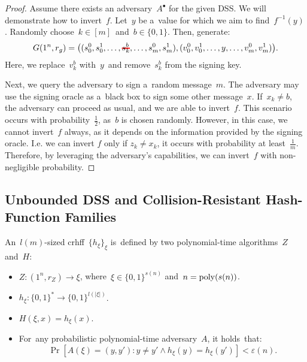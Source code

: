 \begin{proof}
	Assume there exists an adversary~$A^{\bullet}$ for the given DSS.
	We will demonstrate how to invert~$f$.
	Let~$y$ be a~value for which we aim to find~$f^{-1}(y)$.
	Randomly choose~$k \in [m]$~and~$b \in \{0, 1\}$. Then, generate:
	\[
		G(1^{n}, r_g) = \big((s^{0}_{0}, s^{1}_{0}, \ldots, \hcancel[red]{s_{k}}^{b}, \ldots, s^{0}_{m}, s^{1}_{m}), (v^{0}_{0}, v^{1}_{0}, \ldots, y, \ldots, v^{0}_{m}, v^{1}_{m})\big).
	\] 
	Here, we replace~$v_{k}^{b}$ with~$y$~and remove~$s_{k}^{b}$ from the signing key.

	Next, we query the adversary to sign a~random message~$m$.
	The adversary may use the signing oracle as a~black box to sign some other message~$x$.
	If~$x_k \neq b$, the adversary can proceed as usual, and we are able to invert~$f$.
	This scenario occurs with probability~$\frac{1}{2}$, as~$b$ is chosen randomly.
	However, in this case, we cannot invert~$f$ always, as it depends on the information provided by the signing oracle.
	I.e. we can invert $f$ only if  $z_{k} \neq  x_k$, it occurs with probability at least~$\frac{1}{m}$.
	Therefore, by leveraging the adversary's capabilities, we can invert~$f$ with non-negligible probability.
\end{proof}

\subsection{Unbounded DSS and Collision-Resistant Hash-Function Families}

\begin{definition}
    An~$l(m)$-sized crhff~$\{h_{\xi}\}_{\xi}$ is~defined by two polynomial-time algorithms~$Z$ and~$H$:
    \begin{itemize}
        \item $Z \colon (1^{n}, r_Z) \to \xi$, where~$\xi \in \{0, 1\}^{s(n)}$ and~$n = \operatorname{poly}(s(n))$.
        \item $h_{\xi} \colon \{0, 1\}^{*} \to \{0, 1\}^{l(|\xi|)}$.
        \item $H(\xi, x) = h_\xi(x)$.
        \item For~any probabilistic polynomial-time adversary~$A$, it holds~that:
            \[
                \Pr\left[A(\xi) = (y, y') \colon y \neq y' \wedge h_{\xi}(y) = h_{\xi}(y')\right] < \varepsilon(n).
            \]
    \end{itemize}
\end{definition}

